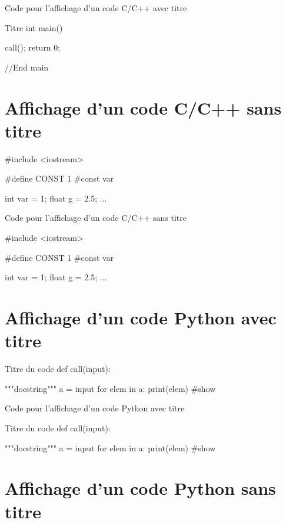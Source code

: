 {\begin{Latex}{Code pour l'affichage d'un code C/C++ avec titre}
\begin{Cpp}{Titre}
        int main() {
          
          call();
          return 0;
        
        }//End main
        
        \end{Cpp}
\end{Latex}

\section{Affichage d'un code C/C++ sans titre}


\begin{Cpp}
#include <iostream>

#define CONST 1 #const var

int var = 1;
float g = 2.5;
...

\end{Cpp}

\begin{Latex}{Code pour l'affichage d'un code C/C++ sans titre}
    \begin{Cpp}
        #include <iostream>
        
        #define CONST 1 #const var
        
        int var = 1;
        float g = 2.5;
        ...
        
        \end{Cpp}
\end{Latex}


\section{Affichage d'un code Python avec titre}


\begin{Python}{Titre du code}
def call(input):

  """docstring"""
  a = input
  for elem in a:
    print(elem) #show
\end{Python}

\begin{Latex}{Code pour l'affichage d'un code Python avec titre}
  \begin{Python}{Titre du code}
    def call(input):
    
      """docstring"""
      a = input
      for elem in a:
        print(elem) #show
    \end{Python}
\end{Latex}

\section{Affichage d'un code Python sans titre}


}
